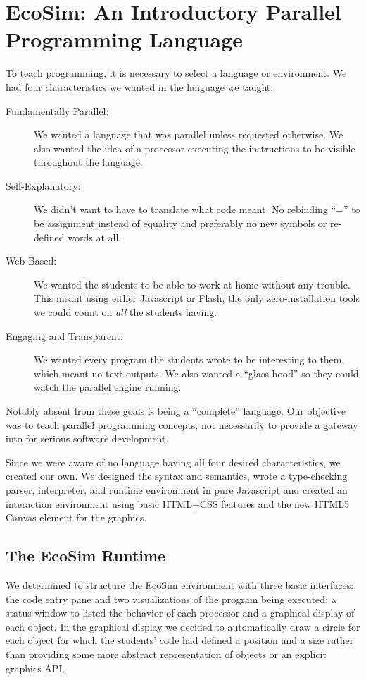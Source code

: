 \documentclass{sig-alternate}
\newcommand{\EcoSim}{EcoSim}
\begin{document}
\section{\EcoSim{}: An Introductory Parallel Programming Language}
To teach programming, it is necessary to select a language or environment.
We had four characteristics we wanted in the language we taught:
\begin{description}
	\item[Fundamentally Parallel:]
		We wanted a language that was parallel unless requested otherwise.
		We also wanted the idea of a processor executing the instructions
		to be visible throughout the language.
	\item[Self-Explanatory:]
		We didn't want to have to translate what code meant.
		No rebinding ``='' to be assignment instead of equality
		and preferably no new symbols or re-defined words at all.
	\item[Web-Based:]
		We wanted the students to be able to work at home without any trouble.
		This meant using either Javascript or Flash, 
		the only zero-installation tools we could count on \emph{all} the students having.
	\item[Engaging and Transparent:]
		We wanted every program the students wrote to be interesting to them, which meant no text outputs.
		We also wanted a ``glass hood'' so they could watch the parallel engine running.
\end{description}
Notably absent from these goals is being a ``complete'' language.
Our objective was to teach parallel programming concepts,
not necessarily to provide a gateway into for serious software development.

Since we were aware of no language having all four desired characteristics, 
we created our own.
We designed the syntax and semantics, 
wrote a type-checking parser, interpreter, and runtime environment in pure Javascript
and created an interaction environment using basic HTML+CSS features 
and the new HTML5 Canvas element for the graphics.

\subsection{The \EcoSim{} Runtime}\label{sec:runtime}
We determined to structure the \EcoSim{} environment with three basic interfaces:
the code entry pane and two visualizations of the program being executed:
a status window to listed the behavior of each processor
and a graphical display of each object.
In the graphical display we decided to automatically draw a circle for each object
for which the students' code had defined a position and a size
rather than providing some more abstract representation of objects
or an explicit graphics API.
\end{document}
